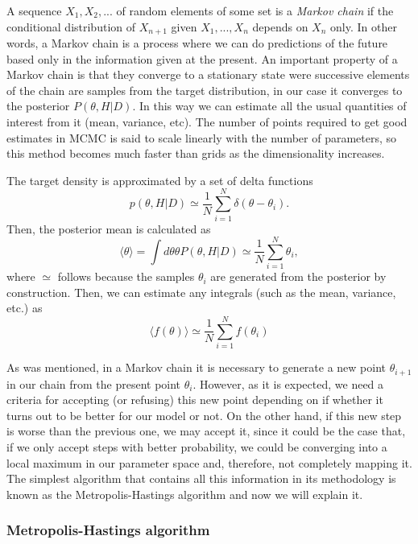 \documentclass[onecolumn,           %
               showpacs,            %
               preprintnumbers,     %
               aps,                 %
               letterpaper,             %
               superscriptaddress,      %
               nofootinbib,         %
               tightenlines,        %
               floats,floatfix      %
               ,usenatbib,
               ]{revtex4-1}
\begin{document}
A sequence $X_1,X_2,...$ of random elements of some set is a \textit{Markov chain} if the conditional distribution of $X_{n+1}$ given $X_1,...,X_n$ depends on $X_n$ only. In other words, a Markov chain is a process where we can do predictions of the future based only in the information given at the present. An important property of a Markov chain is that they converge to a stationary state were successive elements of the chain are samples from the target distribution, in our case it converges to the posterior $P(\theta,H|D)$. In this way we can estimate all the usual quantities of interest from it (mean, variance, etc). The number of points required to get good estimates in MCMC is said to scale linearly with the number of parameters, so this method becomes much faster than grids as the dimensionality increases.

The target density is approximated by a set of delta functions
\begin{equation}
p(\theta,H|D)\simeq \frac{1}{N}\sum_{i=1}^N \delta(\theta-\theta_i).
\end{equation}
Then, the posterior mean is calculated as
\begin{equation}
\langle\theta\rangle=\int d\theta \theta P(\theta,H|D)\simeq \frac{1}{N}\sum_{i=1}^N\theta_i ,
\end{equation}
where $\simeq$ follows because the samples $\theta_i$ are generated from the posterior by construction. Then, we can estimate any integrals (such as the mean, variance, etc.) as
\begin{equation}
\langle f(\theta)\rangle \simeq\frac{1}{N}\sum_{i=1}^N f(\theta_i)
\end{equation}

As was mentioned, in a Markov chain it is necessary to generate a new point $\theta_{i+1}$ in our chain from the present point $\theta_i$. However, as it is expected, we need a criteria for accepting (or refusing) this new point depending on if whether it turns out to be better for our model or not. On the other hand, if this new step is worse than the previous one, we may accept it, since it could be the case that, if we only accept steps with better probability, we could be converging into a local maximum in our parameter space and, therefore, not completely mapping it. The simplest algorithm that contains all this information in its methodology is known as the Metropolis-Hastings algorithm and now we will explain it.
\subsubsection{Metropolis-Hastings algorithm}
\end{document}
